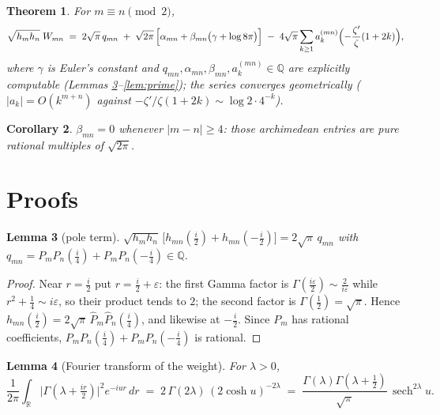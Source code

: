 \documentclass[11pt,a4paper]{article}
\newtheorem{theorem}{Theorem}[section]
\newtheorem{lemma}[theorem]{Lemma}
\newtheorem{corollary}[theorem]{Corollary}
\theoremstyle{remark}
\newcommand{\R}{\mathbb{R}}
\newcommand{\Q}{\mathbb{Q}}
\newcommand{\G}{\Gamma}
\newcommand{\sech}{\operatorname{sech}}
\begin{document}
\begin{tcolorbox}[colback=black!5!white,colframe=black!40!white]
\begin{theorem}\label{thm:main}
For $m\equiv n\pmod 2$,
\[
\sqrt{h_m h_n}\;W_{mn}
\;=\;
2\sqrt{\pi}\,q_{mn}
\;+\;\sqrt{2\pi}\,\Bigl[\alpha_{mn}+\beta_{mn}\bigl(\gamma+\log 8\pi\bigr)\Bigr]
\;-\;4\sqrt{\pi}\sum_{k\ge1} a^{(mn)}_k
\Bigl(-\frac{\zeta'}{\zeta}(1+2k)\Bigr),
\]
where $\gamma$ is Euler's constant and
$q_{mn},\alpha_{mn},\beta_{mn},a^{(mn)}_k\in\Q$ are explicitly
computable (Lemmas \ref{lem:pole}--\ref{lem:prime}); the series
converges geometrically ($|a_k| = O(k^{m+n})$ against
$-\zeta'/\zeta(1+2k)\sim \log 2\cdot 4^{-k}$).
\end{theorem}
\end{tcolorbox}

\begin{corollary}
$\beta_{mn}=0$ whenever $|m-n|\ge4$: those archimedean entries are
pure rational multiples of $\sqrt{2\pi}$.
\end{corollary}

\section{Proofs}

\begin{lemma}[pole term]\label{lem:pole}
$\sqrt{h_mh_n}\,\bigl[h_{mn}(\tfrac i2)+h_{mn}(-\tfrac i2)\bigr]
 = 2\sqrt{\pi}\,q_{mn}$ with
$q_{mn} = P_mP_n(\tfrac i4)+P_mP_n(-\tfrac i4)\in\Q$.
\end{lemma}

\begin{proof}
Near $r=\tfrac i2$ put $r=\tfrac i2+\varepsilon$: the first Gamma
factor is $\G(\tfrac{i\varepsilon}2)\sim \tfrac2{i\varepsilon}$
while $r^2+\tfrac14\sim i\varepsilon$, so their product tends to
$2$; the second factor is $\G(\tfrac12)=\sqrt\pi$.  Hence
$h_{mn}(\tfrac i2) = 2\sqrt\pi\,\widehat P_m\widehat
P_n(\tfrac i4)$, and likewise at $-\tfrac i2$.  Since $P_m$ has
rational coefficients, $P_mP_n(\tfrac i4)+P_mP_n(-\tfrac i4)$
is rational.
\end{proof}

\begin{lemma}[Fourier transform of the weight]\label{lem:fourier}
For $\lambda>0$,
\[
\frac1{2\pi}\int_\R \bigl|\G(\lambda+\tfrac{ir}2)\bigr|^2
e^{-iur}\,dr
\;=\; 2\,\G(2\lambda)\,(2\cosh u)^{-2\lambda}
\;=\; \frac{\G(\lambda)\G(\lambda+\tfrac12)}{\sqrt\pi}\,
\sech^{2\lambda}u .
\]
\end{lemma}
\end{document}
